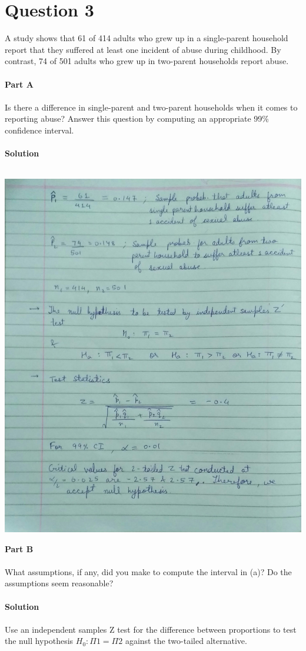 \documentclass[12pt,a4paper]{report}
\begin{document}
\section{Question 3}
A study shows that 61 of 414 adults who grew up in a single-parent household report that they suffered at least one incident of abuse during childhood. By contrast, 74 of 501 adults who grew up in two-parent households report abuse.\\\\
\textbf{Part A}\\\\
Is there a difference in single-parent and two-parent households when it comes to reporting abuse? Answer this question by computing an appropriate 99\% confidence interval.
\\\\
\textbf{Solution}\\\\
\begin{center}
\includegraphics[scale=0.3]{parta.jpg}
\end{center}
\vspace{0.5 in}
\textbf{Part B}\\\\
What assumptions, if any, did you make to compute the interval in (a)? Do the assumptions seem reasonable?\\\\
\textbf{Solution}
\\\\
Use an independent samples Z test for the difference between proportions to test the null hypothesis $H_0 : \Pi 1 = \Pi 2$ against the two-tailed alternative.
\end{document}
